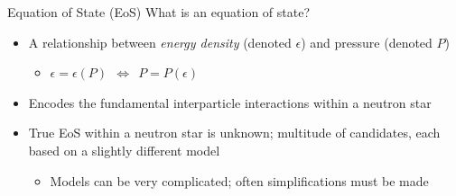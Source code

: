 \documentclass[]{beamer}
\begin{document}
    \begin{frame}{Equation of State (EoS)}
        What is an equation of state? \pause
        \begin{itemize}
            \item A relationship between \textit{energy density} (denoted $\epsilon$) \pause and pressure (denoted $P$) \pause \begin{itemize}
                \item $\epsilon = \epsilon (P)$\pause $~~ \Leftrightarrow ~~  P = P(\epsilon)$ \pause
            \end{itemize}
            \item Encodes the fundamental interparticle interactions within a neutron star \pause
            \item True EoS within a neutron star is unknown; \pause multitude of candidates, each based on a slightly different model \pause \begin{itemize}
                \item Models can be very complicated\pause ; often simplifications must be made \pause
            \end{itemize}
        \end{itemize}
    \end{frame}

\end{document}
